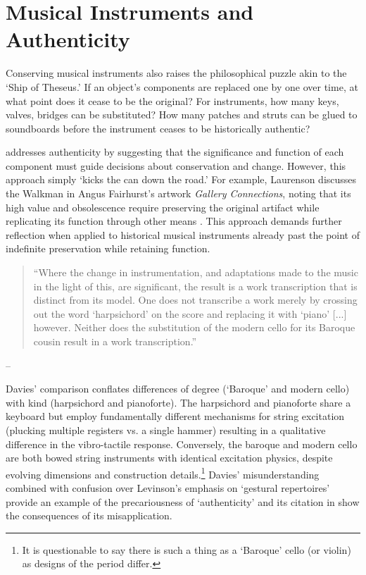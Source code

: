 \section{Musical Instruments and Authenticity}

Conserving musical instruments also raises the philosophical puzzle akin to the `Ship of Theseus.' If an object’s components are replaced one by one over time, at what point does it cease to be the original? For instruments, how many keys, valves, bridges can be substituted? How many patches and struts can be glued to soundboards before the instrument ceases to be historically authentic?

\textcite{laurenson_authenticity_2006} addresses authenticity by suggesting that the significance and function of each component must guide decisions about conservation and change. However, this approach simply  `kicks the can down the road.’ For example, Laurenson discusses the Walkman in Angus Fairhurst’s artwork \textit{Gallery Connections}, noting that its high value and obsolescence require preserving the original artifact while replicating its function through other means \cite{laurenson_management_2005}. This approach demands further reflection when applied to historical musical instruments already past the point of indefinite preservation while retaining function.

\begin{quotation}
    ``Where the change in instrumentation, and adaptations made to the music in the light of this, are significant, the result is a work transcription that is distinct from its model. One does not transcribe a work merely by crossing out the word ‘harpsichord’ on the score and replacing it with ‘piano’ [...] however. Neither does the substitution of the modern cello for its Baroque cousin result in a work transcription.''
\end{quotation}
\begin{flushright}
-- \cite[p. 222]{davies_authenticity_2001}
\end{flushright}

Davies' comparison conflates differences of degree (`Baroque' and modern cello) with kind (harpsichord and pianoforte). The harpsichord and pianoforte share a keyboard but employ fundamentally different mechanisms for string excitation (plucking multiple registers vs. a single hammer) resulting in a qualitative difference in the vibro-tactile response. Conversely, the baroque and modern cello are both bowed string instruments with identical excitation physics, despite evolving dimensions and construction details.\footnote{It is questionable to say there is such a thing as a `Baroque' cello (or violin) as designs of the period differ.} Davies' misunderstanding combined with confusion over Levinson's emphasis on `gestural repertoires' \cite{levinson_music_1990} provide an example of the precariousness of `authenticity' and its citation in \textcite{laurenson_authenticity_2006} show the consequences of its misapplication.

